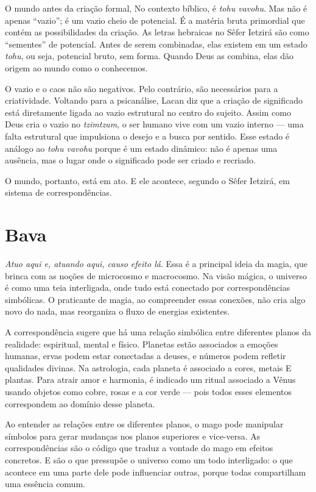 
O mundo antes da criação formal, No contexto bíblico, é \textit{tohu vavohu}. Mas não é apenas ``vazio''; é um vazio cheio de potencial. É a matéria bruta primordial que contém as possibilidades da criação. As letras hebraicas no Sêfer Ietzirá são como “sementes” de potencial. Antes de serem combinadas, elas existem em um estado \textit{tohu}, ou seja, potencial bruto, sem forma. Quando Deus as combina, elas dão origem ao mundo como o conhecemos.

O vazio e o caos não são negativos. Pelo contrário, são necessários para a criatividade. Voltando para a psicanálise, Lacan diz que a criação de significado está diretamente ligada ao vazio estrutural no centro do sujeito. Assim como Deus cria o vazio no \textit{tzimtzum}, o ser humano vive com um vazio interno --- uma falta estrutural que impulsiona o desejo e a busca por sentido. Esse estado é análogo ao \textit{tohu vavohu} porque é um estado dinâmico: não é apenas uma ausência, mas o lugar onde o significado pode ser criado e recriado.

O mundo, portanto, está em ato. E ele acontece, segundo o Sêfer Ietzirá, em sistema de correspondências.

\chapter*{Bava \smallskip{}}

\textit{Atuo aqui e, atuando aqui, causo efeito lá}. Essa é a principal ideia da magia, que brinca com as noções de microcosmo e macrocosmo. Na visão mágica, o universo é como uma teia interligada, onde tudo está conectado por correspondências simbólicas. O praticante de magia, ao compreender essas conexões, não cria algo novo do nada, mas reorganiza o fluxo de energias existentes.

A correspondência sugere que há uma relação simbólica entre diferentes planos da realidade: espiritual, mental e físico. Planetas estão associados a emoções humanas, ervas podem estar conectadas a deuses, e números podem refletir qualidades divinas. Na astrologia, cada planeta é associado a cores, metais E plantas. Para atrair amor e harmonia, é indicado um ritual associado a Vênus usando objetos como cobre, rosas e a cor verde --- pois todos esses elementos correspondem ao domínio desse planeta.

Ao entender as relações entre os diferentes planos, o mago pode manipular símbolos para gerar mudanças nos planos superiores e vice-versa. As correspondências são o código que traduz a vontade do mago em efeitos concretos. E são o que pressupõe o universo como um todo interligado: o que acontece em uma parte dele pode influenciar outras, porque todas compartilham uma essência comum.

